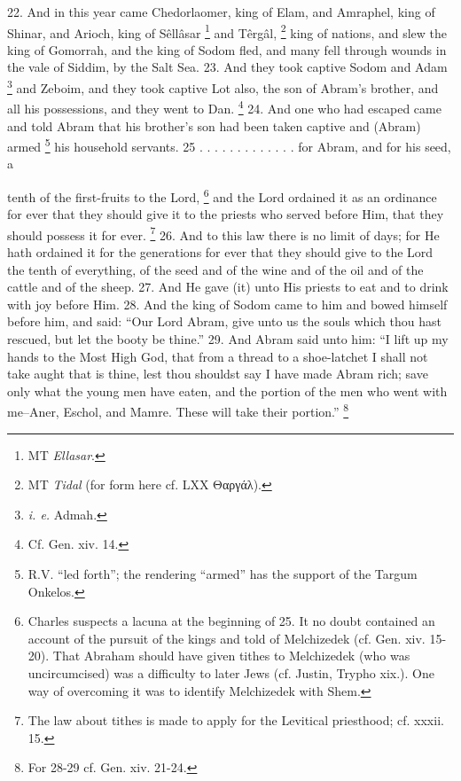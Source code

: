 
22. And in this year came Chedorlaomer, king of Elam, and Amraphel, king of Shinar, and Arioch, king of Sêllâsar \footnote{MT \emph{Ellasar}.} and Têrgâl, \footnote{MT \emph{Tidal} (for form here cf. LXX \textgreek{Θαργάλ}).} king of nations, and slew the king of Gomorrah, and the king of Sodom fled, and many fell through wounds in the vale of Siddim, by the Salt Sea. 23. And they took captive Sodom and Adam \footnote{\emph{i. e.} Admah.} and Zeboim, and they took captive Lot also, the son of Abram's brother, and all his possessions, and they went to Dan. \footnote{Cf. Gen. xiv. 14.} 24. And one who had escaped came and told Abram that his brother's son had been taken captive and (Abram) armed \footnote{R.V. ``led forth''; the rendering ``armed'' has the support of the Targum Onkelos.} his household servants. 25 . . . . . . . . . . . . . for Abram, and for his seed, a

tenth of the first-fruits to the Lord, \footnote{Charles suspects a lacuna at the beginning of 25. It no doubt contained an account of the pursuit of the kings and told of Melchizedek (cf. Gen. xiv. 15-20). That Abraham should have given tithes to Melchizedek (who was uncircumcised) was a difficulty to later Jews (cf. Justin, Trypho xix.). One way of overcoming it was to identify Melchizedek with Shem.} and the Lord ordained it as an ordinance for ever that they should give it to the priests who served before Him, that they should possess it for ever. \footnote{The law about tithes is made to apply for the Levitical priesthood; cf. xxxii. 15.} 26. And to this law there is no limit of days; for He hath ordained it for the generations for ever that they should give to the Lord the tenth of everything, of the seed and of the wine and of the oil and of the cattle and of the sheep. 27. And He gave (it) unto His priests to eat and to drink with joy before Him. 28. And the king of Sodom came to him and bowed himself before him, and said: ``Our Lord Abram, give unto us the souls which thou hast rescued, but let the booty be thine.'' 29. And Abram said unto him: ``I lift up my hands to the Most High God, that from a thread to a shoe-latchet I shall not take aught that is thine, lest thou shouldst say I have made Abram rich; save only what the young men have eaten, and the portion of the men who went with me--Aner, Eschol, and Mamre. These will take their portion.'' \footnote{For 28-29 cf. Gen. xiv. 21-24.}


